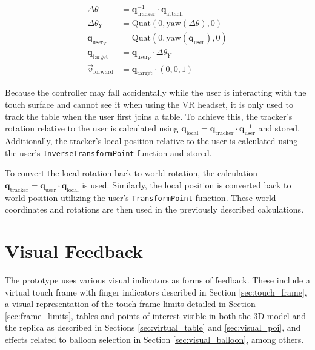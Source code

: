     \begin{figure}[h]
    \begin{equation}
    \begin{split} \label{eq:tracker}
        \Delta\theta&=\mathbf{q}_{\mathrm{tracker}}^{-1}\cdot \mathbf{q}_{\mathrm{attach}} \\
        \Delta\theta_Y &= \mathrm{Quat}(0, \mathrm{yaw}(\Delta\theta), 0) \\
        \mathbf{q}_{\mathrm{user}_Y} &= \mathrm{Quat}(0, \mathrm{yaw}(\mathbf{q}_{\mathrm{user}}), 0) \\
        \mathbf{q}_{\mathrm{target}} &= \mathbf{q}_{\mathrm{user}_Y} \cdot \Delta\theta_Y \\
        \vec{v}_{\mathrm{forward}} &= \mathbf{q}_{\mathrm{target}} \cdot (0,0,1)
    \end{split}
    \end{equation}
    \end{figure}

    Because the controller may fall accidentally while the user is interacting with the touch surface and cannot see it when using the VR headset, it is only used to track the table when the user first joins a table. To achieve this, the tracker's rotation relative to the user is calculated using $\mathbf{q}_{\mathrm{local}} = \mathbf{q}_{\mathrm{tracker}} \cdot \mathbf{q}_{\mathrm{user}}^{-1}$ and stored. Additionally, the tracker's local position relative to the user is calculated using the user's \lstinline{InverseTransformPoint} function and stored.

    To convert the local rotation back to world rotation, the calculation  $\mathbf{q}_{\mathrm{tracker}} = \mathbf{q}_{\mathrm{user}} \cdot \mathbf{q}_{\mathrm{local}}$ is used. Similarly, the local position is converted back to world position utilizing the user's \lstinline{TransformPoint} function. These world coordinates and rotations are then used in the previously described calculations.

\section{Visual Feedback}

    The prototype uses various visual indicators as forms of feedback. These include a virtual touch frame with finger indicators described in Section \ref{sec:touch_frame}, a visual representation of the touch frame limits detailed in Section \ref{sec:frame_limits}, tables and points of interest visible in both the 3D model and the replica as described in Sections \ref{sec:virtual_table} and \ref{sec:visual_poi}, and effects related to balloon selection in Section \ref{sec:visual_balloon}, among others.

